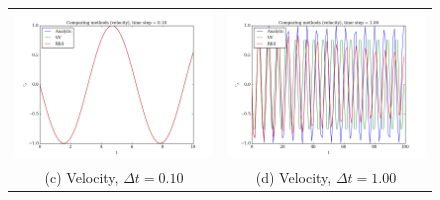 \documentclass{article}
\begin{document}
\begin{multicols}{2}
\begin{figure}
\begin{center}
\begin{tabular}{cc}
	  \includegraphics[width=90mm]{Images/comparison_v_01.png}
	& \includegraphics[width=90mm]{Images/comparison_v_1.png} \\
	(c) Velocity, $\Delta t = 0.10$				& (d) Velocity, $\Delta t = 1.00$  \\[6pt]
	

\end{tabular}
\end{center}
\end{figure}
\end{multicols}
\end{document}
